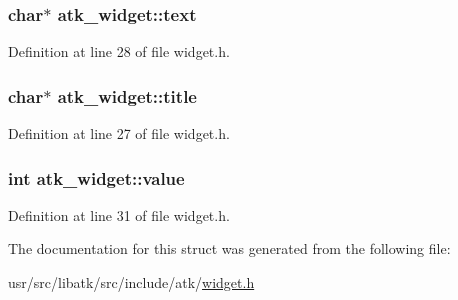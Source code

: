 \hypertarget{structatk__widget_a1d572a95740071ab836bb88609bb28c4}{
\subsubsection[{text}]{\setlength{\rightskip}{0pt plus 5cm}char$\ast$ atk\+\_\+widget\+::text}}\label{structatk__widget_a1d572a95740071ab836bb88609bb28c4}


Definition at line 28 of file widget.\+h.

\hypertarget{structatk__widget_a1f6e2c4d43fa2723ea96e74e4369f915}{
\subsubsection[{title}]{\setlength{\rightskip}{0pt plus 5cm}char$\ast$ atk\+\_\+widget\+::title}}\label{structatk__widget_a1f6e2c4d43fa2723ea96e74e4369f915}


Definition at line 27 of file widget.\+h.

\hypertarget{structatk__widget_a7476e90289581e13fe6978ac3dbc9b0c}{
\subsubsection[{value}]{\setlength{\rightskip}{0pt plus 5cm}int atk\+\_\+widget\+::value}}\label{structatk__widget_a7476e90289581e13fe6978ac3dbc9b0c}


Definition at line 31 of file widget.\+h.



The documentation for this struct was generated from the following file\+:\begin{DoxyCompactItemize}
\item 
usr/src/libatk/src/include/atk/\hyperlink{widget_8h}{widget.\+h}\end{DoxyCompactItemize}
